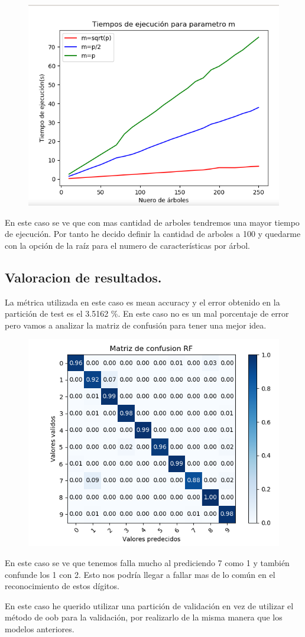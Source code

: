 \documentclass[titlepage]{article}
\begin{document}
	\begin{figure}[H]
		\centering
		\includegraphics[width=0.7\linewidth]{../imagenesRF/tiempoEjecucion}
		\caption{}
		\label{fig:tiempoejecucion}
	\end{figure}

	En este caso se ve que con mas cantidad de arboles tendremos una mayor tiempo de ejecución. Por tanto he decido definir la cantidad de arboles a 100 y quedarme con la opción de la raíz para el numero de características por árbol.
	
	
	\subsection{Valoracion de resultados.}
	La métrica utilizada en este caso es mean accuracy y el error obtenido en la partición de test es el 3.5162 \%. En este caso no es un mal porcentaje de error pero vamos a analizar la matriz de confusión para tener una mejor idea.
	
	\begin{figure}[H]
		\centering
		\includegraphics[width=0.7\linewidth]{../imagenesRF/matrizConfusion}
		\caption{}
		\label{fig:Matriz de confusión RF}
	\end{figure}
	
	En este caso se ve que tenemos falla mucho al prediciendo 7 como 1 y también confunde los 1 con 2. Esto nos podría llegar a fallar mas de lo común en el reconocimiento de estos dígitos.
	
	En este caso he querido utilizar una partición de validación en vez de utilizar el método de oob para la validación, por realizarlo de la misma manera que los modelos anteriores.
	
	
\end{document}
